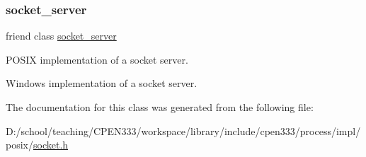 \subsubsection{\texorpdfstring{socket\+\_\+server}{socket\_server}}
{\footnotesize\ttfamily friend class \hyperlink{classcpen333_1_1process_1_1posix_1_1socket__server}{socket\+\_\+server}\hspace{0.3cm}{\ttfamily [friend]}}



P\+O\+S\+IX implementation of a socket server. 

Windows implementation of a socket server. 

The documentation for this class was generated from the following file\+:\begin{DoxyCompactItemize}
\item 
D\+:/school/teaching/\+C\+P\+E\+N333/workspace/library/include/cpen333/process/impl/posix/\hyperlink{impl_2posix_2socket_8h}{socket.\+h}\end{DoxyCompactItemize}

